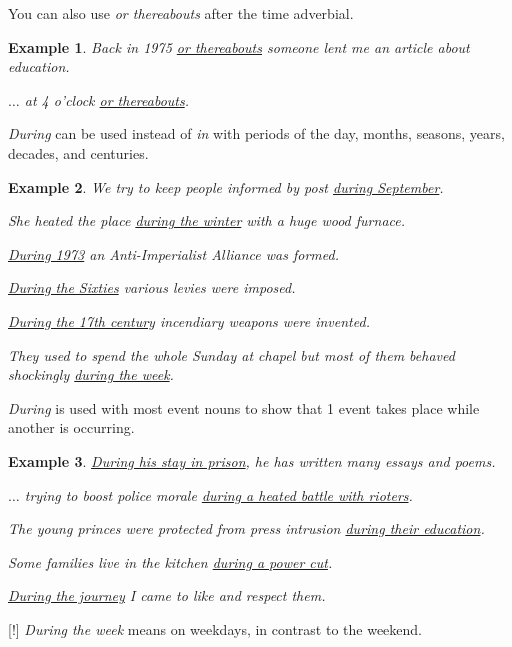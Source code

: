 \documentclass[oneside]{book}
\numberwithin{equation}{section}
\newtheorem{example}{Example}[section]
\begin{document}
%
\noindent{} You can also use \textit{or thereabouts} after the time adverbial.
\begin{example}
    Back in 1975 \underline{or thereabouts} someone lent me an article about education.
    
    $\ldots$ at 4 o'clock \underline{or thereabouts}.
\end{example}
%
\noindent{} \textit{During} can be used instead of \textit{in} with periods of the day, months, seasons, years, decades, and centuries.
\begin{example}
    We try to keep people informed by post \underline{during September}.
    
    She heated the place \underline{during the winter} with a huge wood furnace.
    
    \underline{During 1973} an Anti-Imperialist Alliance was formed.
    
    \underline{During the Sixties} various levies were imposed.
    
    \underline{During the 17th century} incendiary weapons were invented.
    
    They used to spend the whole Sunday at chapel but most of them behaved shockingly \underline{during the week}.
\end{example}
%
\noindent{} \textit{During} is used with most event nouns to show that 1 event takes place while another is occurring.
\begin{example}
    \underline{During his stay in prison}, he has written many essays and poems.
    
    $\ldots$ trying to boost police morale \underline{during a heated battle with rioters}.
    
    The young princes were protected from press intrusion \underline{during their education}.
    
    Some families live in the kitchen \underline{during a power cut}.
    
    \underline{During the journey} I came to like and respect them.
\end{example}
%
\noindent{} [!] \textit{During the week} means on weekdays, in contrast to the weekend.
\end{document}

